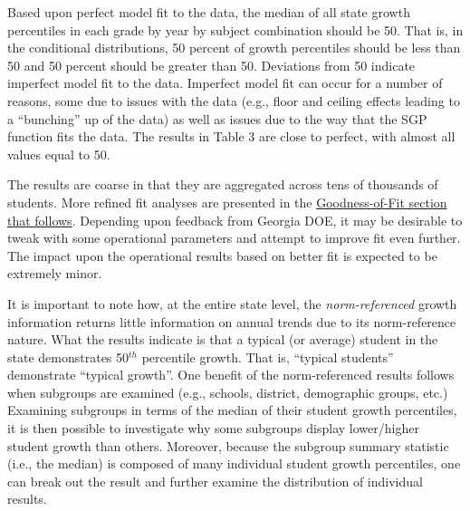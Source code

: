 \documentclass[12pt]{article}
\begin{document}
Based upon perfect model fit to the data, the median of all state growth
percentiles in each grade by year by subject combination should be 50.
That is, in the conditional distributions, 50 percent of growth
percentiles should be less than 50 and 50 percent should be greater than
50. Deviations from 50 indicate imperfect model fit to the data.
Imperfect model fit can occur for a number of reasons, some due to
issues with the data (e.g., floor and ceiling effects leading to a
``bunching'' up of the data) as well as issues due to the way that the
SGP function fits the data. The results in Table 3 are close to perfect,
with almost all values equal to 50.

The results are coarse in that they are aggregated across tens of
thousands of students. More refined fit analyses are presented in the
\hyperref[goodness-of-fit]{Goodness-of-Fit section that follows}.
Depending upon feedback from Georgia DOE, it may be desirable to tweak
with some operational parameters and attempt to improve fit even
further. The impact upon the operational results based on better fit is
expected to be extremely minor.

It is important to note how, at the entire state level, the
\emph{norm-referenced} growth information returns little information on
annual trends due to its norm-reference nature. What the results
indicate is that a typical (or average) student in the state
demonstrates 50\(^{th}\) percentile growth. That is, ``typical
students'' demonstrate ``typical growth''. One benefit of the
norm-referenced results follows when subgroups are examined (e.g.,
schools, district, demographic groups, etc.) Examining subgroups in
terms of the median of their student growth percentiles, it is then
possible to investigate why some subgroups display lower/higher student
growth than others. Moreover, because the subgroup summary statistic
(i.e., the median) is composed of many individual student growth
percentiles, one can break out the result and further examine the
distribution of individual results.

\end{document}
